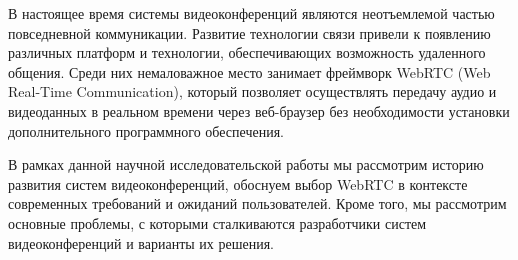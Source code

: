 
В настоящее время системы видеоконференций являются неотъемлемой частью повседневной коммуникации. Развитие технологии связи привели к появлению различных платформ и технологии, обеспечивающих возможность удаленного общения. Среди них немаловажное место занимает фреймворк WebRTC (Web Real-Time Communication), который позволяет осуществлять передачу аудио и видеоданных в реальном времени через веб-браузер без необходимости установки дополнительного программного обеспечения.

В рамках данной научной исследовательской работы мы рассмотрим историю развития систем видеоконференций, обоснуем выбор WebRTC в контексте современных требований и ожиданий пользователей. Кроме того, мы рассмотрим основные проблемы, с которыми сталкиваются разработчики систем видеоконференций и варианты их решения.
